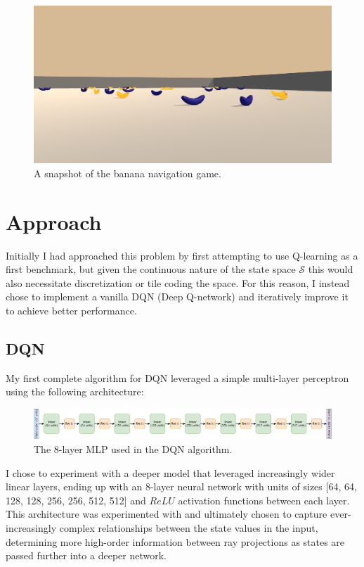 \documentclass[11pt]{article}
\begin{document}
\FloatBarrier

\begin{figure}[!ht]
	\centering
	\includegraphics[width=0.75\linewidth]{images/example-game-image.png}
	\caption{A snapshot of the banana navigation game.}
	\label{fig:example-game-image}
\end{figure}

\FloatBarrier

\section{Approach}

Initially I had approached this problem by first attempting to use Q-learning as
a first benchmark, but given the continuous nature of the state space
$\mathcal{S}$ this would also necessitate discretization or tile coding the
space. For this reason, I instead chose to implement a vanilla DQN (Deep
Q-network) and iteratively improve it to achieve better performance.

\subsection{DQN}

My first complete algorithm for DQN leveraged a simple multi-layer perceptron
using the following architecture:

\FloatBarrier

\begin{figure}[!ht]
    \centering
	\includegraphics[width=\linewidth]{images/dqn-architecture.png}
    \caption{The 8-layer MLP used in the DQN algorithm.}
    \label{fig:dqn-architecture}
\end{figure}

\FloatBarrier

I chose to experiment with a deeper model that leveraged increasingly wider linear layers,
 ending up with an 8-layer neural network with units of sizes [64, 64, 128, 128, 
 256, 256, 512, 512] and $ReLU$ activation functions between each layer. This architecture was experimented with and ultimately chosen to capture ever-increasingly complex relationships between the state values in the input, determining more high-order information between ray projections as states are passed further into a deeper network.
\end{document}
